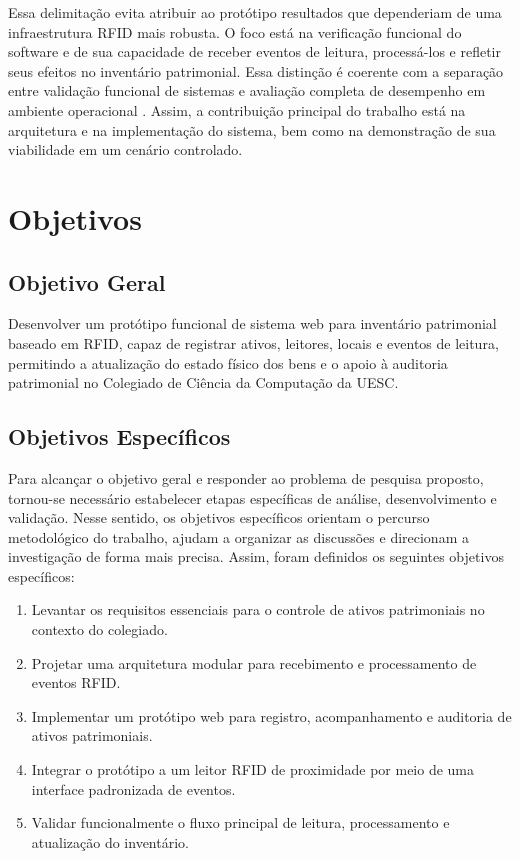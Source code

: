 Essa delimitação evita atribuir ao protótipo resultados que dependeriam de uma infraestrutura RFID mais robusta. O foco está na verificação funcional do software e de sua capacidade de receber eventos de leitura, processá-los e refletir seus efeitos no inventário patrimonial. Essa distinção é coerente com a separação entre validação funcional de sistemas e avaliação completa de desempenho em ambiente operacional \cite{ieee1012}. Assim, a contribuição principal do trabalho está na arquitetura e na implementação do sistema, bem como na demonstração de sua viabilidade em um cenário controlado.

\section{Objetivos}

\subsection{Objetivo Geral}

Desenvolver um protótipo funcional de sistema web para inventário patrimonial baseado em RFID, capaz de registrar ativos, leitores, locais e eventos de leitura, permitindo a atualização do estado físico dos bens e o apoio à auditoria patrimonial no Colegiado de Ciência da Computação da UESC.

\subsection{Objetivos Específicos}

Para alcançar o objetivo geral e responder ao problema de pesquisa proposto, tornou-se necessário estabelecer etapas específicas de análise, desenvolvimento e validação. Nesse sentido, os objetivos específicos orientam o percurso metodológico do trabalho, ajudam a organizar as discussões e direcionam a investigação de forma mais precisa. Assim, foram definidos os seguintes objetivos específicos:

\begin{enumerate}
    \item Levantar os requisitos essenciais para o controle de ativos patrimoniais no contexto do colegiado.
    \item Projetar uma arquitetura modular para recebimento e processamento de eventos RFID.
    \item Implementar um protótipo web para registro, acompanhamento e auditoria de ativos patrimoniais.
    \item Integrar o protótipo a um leitor RFID de proximidade por meio de uma interface padronizada de eventos.
    \item Validar funcionalmente o fluxo principal de leitura, processamento e atualização do inventário.
\end{enumerate}

